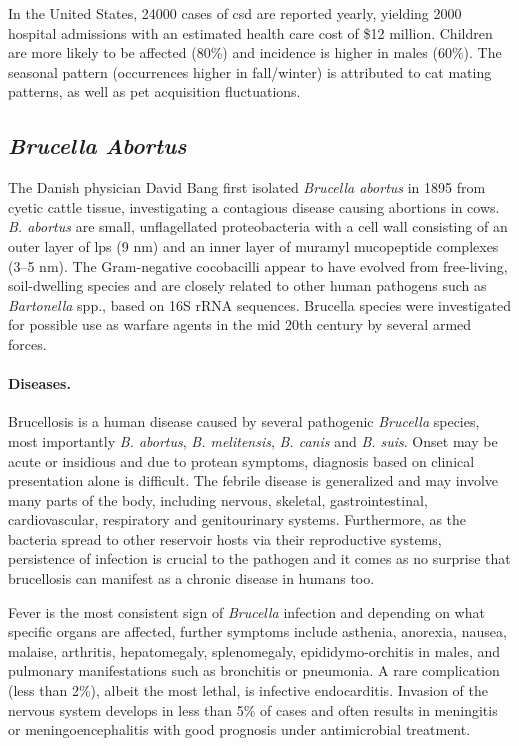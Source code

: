 In the United States, 24000 cases of \gls{csd} are reported yearly, yielding 2000 hospital admissions with an estimated health care cost of \$12 million. Children are more likely to be affected (80\%) and incidence is higher in males (60\%). The seasonal pattern (occurrences higher in fall/winter) is attributed to cat mating patterns, as well as pet acquisition fluctuations.

\subsection{\textit{Brucella Abortus}}

The Danish physician David Bang first isolated \textit{Brucella abortus} in 1895 from cyetic cattle tissue, investigating a contagious disease causing abortions in cows. \textit{B. abortus} are small, unflagellated proteobacteria with a cell wall consisting of an outer layer of \gls{lps} (9 nm) and an inner layer of muramyl mucopeptide complexes (3--5 nm). The Gram-negative cocobacilli appear to have evolved from free-living, soil-dwelling species and are closely related to other human pathogens such as \textit{Bartonella} spp., based on 16S rRNA sequences. Brucella species were investigated for possible use as warfare agents in the mid 20th century by several armed forces. \citep{Atluri2011,VonBargen2012}

\paragraph{Diseases.}
Brucellosis is a human disease caused by several pathogenic \textit{Brucella} species, most importantly \textit{B. abortus}, \textit{B. melitensis}, \textit{B. canis} and \textit{B. suis}. Onset may be acute or insidious and due to protean symptoms, diagnosis based on clinical presentation alone is difficult. The febrile disease is generalized and may involve many parts of the body, including nervous, skeletal, gastrointestinal, cardiovascular, respiratory and genitourinary systems. Furthermore, as the bacteria spread to other reservoir hosts via their reproductive systems, persistence of infection is crucial to the pathogen and it comes as no surprise that brucellosis can manifest as a chronic disease in humans too.

Fever is the most consistent sign of \textit{Brucella} infection and depending on what specific organs are affected, further symptoms include asthenia, anorexia, nausea, malaise, arthritis, hepatomegaly, splenomegaly, epididymo-orchitis in males, and pulmonary manifestations such as bronchitis or pneumonia. A rare complication (less than 2\%), albeit the most lethal, is infective endocarditis. Invasion of the nervous system develops in less than 5\% of cases and often results in meningitis or meningoencephalitis with good prognosis under antimicrobial treatment.

